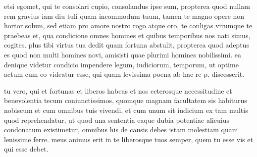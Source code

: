 


 etsi egomet, qui te consolari cupio, consolandus ipse sum, propterea quod nullam rem gravius iam diu tuli quam incommodum tuum, tamen te magno opere non hortor solum, sed etiam pro amore nostro rogo atque oro, te conligas virumque te praebeas et, qua condicione omnes homines et quibus temporibus nos nati simus, cogites. plus tibi virtus tua dedit quam fortuna abstulit, propterea quod adeptus es quod non multi homines novi, amisisti quae plurimi homines nobilissimi. ea denique videtur condicio impendere legum, iudiciorum, temporum, ut optime actum cum eo videatur esse, qui quam levissima poena ab hac re p. discesserit.

 tu vero, qui et fortunas et liberos habeas et nos ceterosque necessitudine et benevolentia tecum coniunctissimos, quomque magnam facultatem sis habiturus nobiscum et cum omnibus tuis vivendi, et cum unum sit iudicium ex tam multis quod reprehendatur, ut quod una sententia eaque dubia potentiae alicuius condonatum existimetur, omnibus his de causis debes istam molestiam quam lenissime ferre. meus animus erit in te liberosque tuos semper, quem tu esse vis et qui esse debet.
